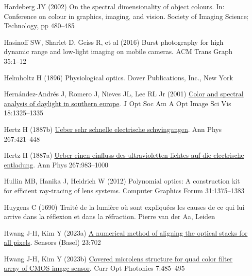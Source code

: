 \documentclass[
  letterpaper,
]{book}
\newlength{\cslhangindent}
\newenvironment{CSLReferences}[2] %
 {\begin{list}{}{%
  \setlength{\itemindent}{0pt}
  \setlength{\leftmargin}{0pt}
  \setlength{\parsep}{0pt}
  \ifodd #1
   \setlength{\leftmargin}{\cslhangindent}
   \setlength{\itemindent}{-1\cslhangindent}
  \fi
  \setlength{\itemsep}{#2\baselineskip}}}
 {\end{list}}
\begin{document}
\begin{CSLReferences}{1}{1}
Hardeberg JY (2002)
\href{https://library.imaging.org/cgiv/articles/1/1/art00101}{On the
spectral dimensionality of object colours}. In: Conference on colour in
graphics, imaging, and vision. Society of Imaging Science; Technology,
pp 480--485

Hasinoff SW, Sharlet D, Geiss R, et al (2016) Burst photography for high
dynamic range and low-light imaging on mobile cameras. ACM Trans Graph
35:1--12

Helmholtz H (1896) Physiological optics. Dover Publications, Inc., New
York

Hernández-Andrés J, Romero J, Nieves JL, Lee RL Jr (2001)
\href{https://colorimaginglab.ugr.es/pages/pdfs/josaa_2001_1325/\%21}{Color
and spectral analysis of daylight in southern europe}. J Opt Soc Am A
Opt Image Sci Vis 18:1325--1335

Hertz H (1887b) \href{http://dx.doi.org/10.1002/andp.18872670707}{Ueber
sehr schnelle electrische schwingungen}. Ann Phys 267:421--448

Hertz H (1887a) \href{http://dx.doi.org/10.1002/andp.18872670827}{Ueber
einen einfluss des ultravioletten lichtes auf die electrische
entladung}. Ann Phys 267:983--1000

Hullin MB, Hanika J, Heidrich W (2012) Polynomial optics: {A}
construction kit for efficient ray-tracing of lens systems. Computer
Graphics Forum 31:1375--1383

Huygens C (1690) Traité de la lumière où sont expliquées les causes de
ce qui lui arrive dans la réflexion et dans la réfraction. Pierre van
der Aa, Leiden

Hwang J-H, Kim Y (2023a) \href{http://dx.doi.org/10.3390/s23020702}{A
numerical method of aligning the optical stacks for all pixels}. Sensors
(Basel) 23:702

Hwang J-H, Kim Y (2023b)
\href{http://dx.doi.org/10.1364/COPP.7.000485}{Covered microlens
structure for quad color filter array of {CMOS} image sensor}. Curr Opt
Photonics 7:485--495


\end{CSLReferences}
\end{document}
